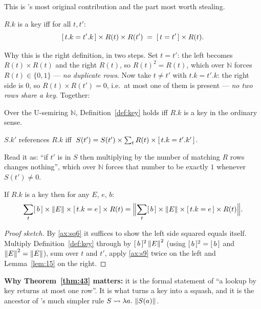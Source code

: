 This is \udp{}'s most original contribution and the part most worth stealing.

\begin{definition}\label{def:key}
$R.k$ is a key iff for all $t,t'$:
\[
[\,t.k = t'.k\,]\times R(t)\times R(t') \;=\; [\,t=t'\,]\times R(t).
\]
\end{definition}

Why this is the right definition, in two steps. Set $t=t'$: the left becomes
$R(t)\times R(t)$ and the right $R(t)$, so $R(t)^2 = R(t)$, which over $\mathbb{N}$ forces
$R(t)\in\{0,1\}$ --- \emph{no duplicate rows}. Now take $t\neq t'$ with $t.k=t'.k$: the
right side is $0$, so $R(t)\times R(t')=0$, i.e.\ at most one of them is present ---
\emph{no two rows share a key}. Together:

\begin{theorem}
Over the U-semiring $\mathbb{N}$, Definition~\ref{def:key} holds iff $R.k$ is a key in the
ordinary sense.
\end{theorem}

\begin{definition}\label{def:fk}
$S.k'$ references $R.k$ iff
$\;S(t') = S(t')\times\sum_{t}R(t)\times[\,t.k=t'.k'\,]$.
\end{definition}
Read it as: ``if $t'$ is in $S$ then multiplying by the number of matching $R$ rows changes
nothing'', which over $\mathbb{N}$ forces that number to be exactly $1$ whenever
$S(t')\neq0$.

\begin{theorem}\label{thm:43}
If $R.k$ is a key then for any $E$, $e$, $b$:
\[
\sum_{t}[\,b\,]\times\left\lVert E \right\rVert\times[\,t.k=e\,]\times R(t)
=\Bigl\lVert \sum_{t}[\,b\,]\times\left\lVert E \right\rVert\times[\,t.k=e\,]\times R(t)\Bigr\rVert.
\]
\end{theorem}
\begin{proof}[Proof sketch]
By \eqref{ax:sq6} it suffices to show the left side squared equals itself. Multiply
Definition~\ref{def:key} through by $[\,b\,]^2\left\lVert E \right\rVert^2$ (using $[\,b\,]^2=[\,b\,]$ and
$\left\lVert E \right\rVert^2=\left\lVert E \right\rVert$), sum over $t$ and $t'$, apply \eqref{ax:s9} twice on the left and
Lemma~\ref{lem:15} on the right.
\end{proof}

\noindent\textbf{Why Theorem~\ref{thm:43} matters:} it is the formal statement of
``a lookup by key returns at most one row''. It is what turns a key into a squash, and it
is the ancestor of \QED{}'s much simpler rule $S \rightsquigarrow \lambda a.\,\left\lVert S(a) \right\rVert$.

